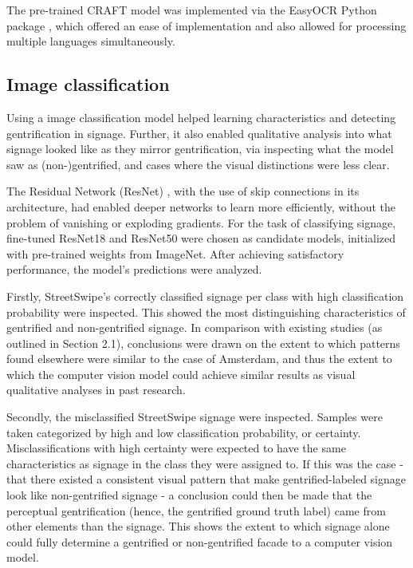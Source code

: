 The pre-trained CRAFT model was implemented via the EasyOCR Python package \cite{noauthor_jaided_nodate}, which offered an ease of implementation and also allowed for processing multiple languages simultaneously.

\subsection{Image classification}

Using a image classification model helped learning characteristics and detecting gentrification in signage. Further, it also enabled qualitative analysis into what signage looked like as they mirror gentrification, via inspecting what the model saw as (non-)gentrified, and cases where the visual distinctions were less clear.

The Residual Network (ResNet) \cite{resnet}, with the use of skip connections in its architecture, had enabled deeper networks to learn more efficiently, without the problem of vanishing or exploding gradients. For the task of classifying signage, fine-tuned ResNet18 and ResNet50 were chosen as candidate models, initialized with pre-trained weights from ImageNet. After achieving satisfactory performance, the model's predictions were analyzed. 

Firstly, StreetSwipe's correctly classified signage per class with high classification probability were inspected. This showed the most distinguishing characteristics of gentrified and non-gentrified signage. In comparison with existing studies (as outlined in Section 2.1), conclusions were drawn on the extent to which patterns found elsewhere were similar to the case of Amsterdam, and thus the extent to which the computer vision model could achieve similar results as visual qualitative analyses in past research.

Secondly, the misclassified StreetSwipe signage were inspected. Samples were taken categorized by high and low classification probability, or certainty. Misclassifications with high certainty were expected to have the same characteristics as signage in the class they were assigned to. If this was the case - that there existed a consistent visual pattern that make gentrified-labeled signage look like non-gentrified signage - a conclusion could then be made that the perceptual gentrification (hence, the gentrified ground truth label) came from other elements than the signage. This shows the extent to which signage alone could fully determine a gentrified or non-gentrified facade to a computer vision model.

